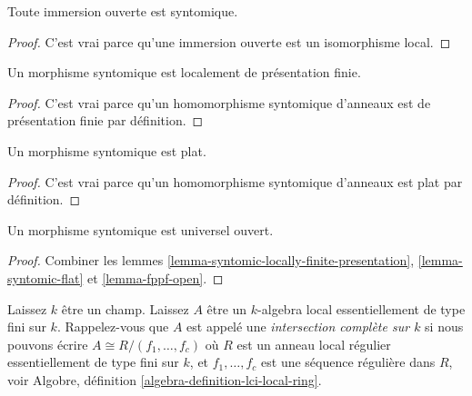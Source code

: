 \begin{lemma}

\label{lemma-open-immersion-syntomic}
Toute immersion ouverte est syntomique.
\end{lemma}

\begin{proof}

C'est vrai parce qu'une immersion ouverte est un isomorphisme local.

\end{proof}

\begin{lemma}

\label{lemma-syntomic-locally-finite-presentation}

Un morphisme syntomique est localement de présentation finie.

\end{lemma}

\begin{proof}

C'est vrai parce qu'un homomorphisme syntomique d'anneaux est de présentation finie par définition.

\end{proof}

\begin{lemma}

\label{lemma-syntomic-flat}
Un morphisme syntomique est plat.
\end{lemma}

\begin{proof}

C'est vrai parce qu'un homomorphisme syntomique d'anneaux est plat par définition.

\end{proof}

\begin{lemma}

\label{lemma-syntomic-open}
Un morphisme syntomique est universel ouvert.
\end{lemma}

\begin{proof}
Combiner les lemmes \ref{lemma-syntomic-locally-finite-presentation}, \ref{lemma-syntomic-flat} et \ref{lemma-fppf-open}.
\end{proof}

\noindent
Laissez $k$ être un champ. Laissez $A$ être un $k$-algebra local essentiellement de type fini sur $k$. Rappelez-vous que $A$ est appelé une {\it intersection complète sur $k$} si nous pouvons écrire $A \cong R/(f_1, \ldots, f_c)$ où $R$ est un anneau local régulier essentiellement de type fini sur $k$, et $f_1, \ldots, f_c$ est une séquence régulière dans $R$, voir Algobre, définition \ref{algebra-definition-lci-local-ring}.

